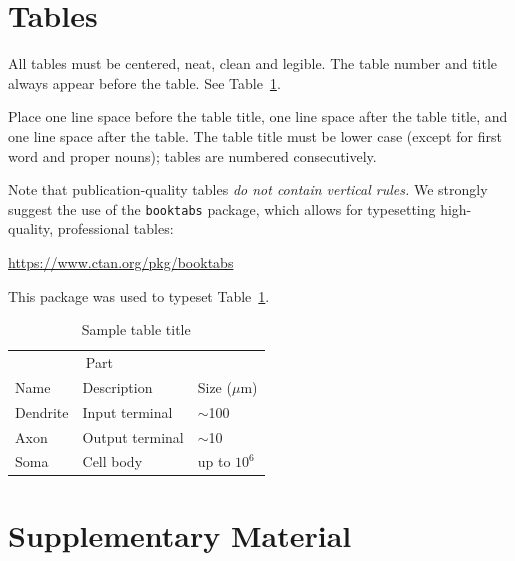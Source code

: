 \documentclass[final]{article}
\begin{document}
\section{Tables}


All tables must be centered, neat, clean and legible.  The table number and
title always appear before the table.  See Table~\ref{sample-table}.


Place one line space before the table title, one line space after the
table title, and one line space after the table. The table title must
be lower case (except for first word and proper nouns); tables are
numbered consecutively.


Note that publication-quality tables \emph{do not contain vertical rules.} We
strongly suggest the use of the \verb+booktabs+ package, which allows for
typesetting high-quality, professional tables:
\begin{center}
    \url{https://www.ctan.org/pkg/booktabs}
\end{center}
This package was used to typeset Table~\ref{sample-table}.


\begin{table}[H]
    \caption{Sample table title}
    \label{sample-table}
    \centering
    \begin{tabular}{lll}
        \toprule
        \multicolumn{2}{c}{Part}                   \\
        \cmidrule(r){1-2}
        Name     & Description     & Size ($\mu$m) \\
        \midrule
        Dendrite & Input terminal  & $\sim$100     \\
        Axon     & Output terminal & $\sim$10      \\
        Soma     & Cell body       & up to $10^6$  \\
        \bottomrule
    \end{tabular}
\end{table}


\newpage

\section{Supplementary Material}

\setcounter{figure}{0}
\renewcommand{\thefigure}{S\arabic{figure}}
\end{document}
